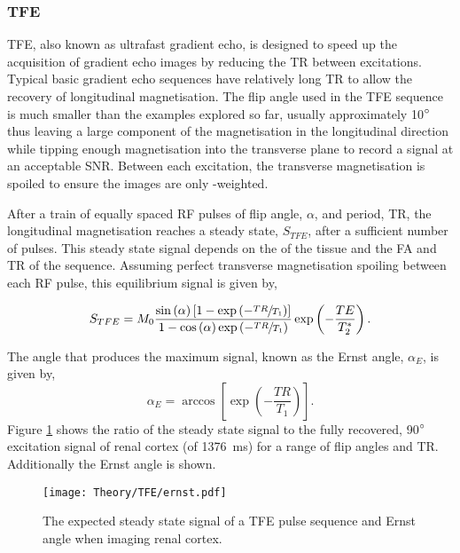 \subsubsection{\ac*{TFE}}
\ac{TFE}, also known as ultrafast gradient echo, is designed to speed up the acquisition of gradient echo images by reducing the \ac{TR} between excitations. Typical basic gradient echo sequences have relatively long \ac{TR} to allow the recovery of longitudinal magnetisation. The flip angle used in the \ac{TFE} sequence is much smaller than the examples explored so far, usually approximately 10$\degree$ thus leaving a large component of the magnetisation in the longitudinal direction while tipping enough magnetisation into the transverse plane to record a signal at an acceptable \ac{SNR}. Between each excitation, the transverse magnetisation is spoiled to ensure the images are only \tone-weighted. 

After a train of equally spaced \ac{RF} pulses of flip angle, $\alpha$, and period, \ac{TR}, the longitudinal magnetisation reaches a steady state, $S_{TFE}$, after a sufficient number of pulses. This steady state signal depends on the \tone of the tissue and the \ac{FA} and \ac{TR} of the sequence. Assuming perfect transverse magnetisation spoiling between each \ac{RF} pulse, this equilibrium signal is given by,

\begin{equation}
	S_{TFE} = M_0 \frac{\sin \left( \alpha \right) \left[ 1 - \exp \left( -\sfrac{TR}{T_1}\right) \right]}{1-\cos \left( \alpha \right) \exp \left( -\sfrac{TR}{T_1}\right)} \exp \left( - \frac{TE}{T_2^*}\right).
	\label{eq:tfe_signal}
\end{equation}

The angle that produces the maximum signal, known as the Ernst angle, $\alpha_E$, is given by,
\begin{equation}
	\alpha_E = \arccos \left[ \exp \left( -\frac{TR}{T_1}\right)\right].
	\label{eq:theory_ernst}
\end{equation}
Figure \ref{fig:theory_ernst} shows the ratio of the steady state signal to the fully recovered, 90$\degree${ } excitation signal of renal cortex (\tone of 1376~ms) for a range of flip angles and \ac{TR}. Additionally the Ernst angle is shown. 
\begin{figure}[H]
	\centering
	\texttt{[image: Theory/TFE/ernst.pdf]}
	\caption{The expected steady state signal of a \ac{TFE} pulse sequence and Ernst angle when imaging renal cortex.}
	\label{fig:theory_ernst}	
\end{figure}

